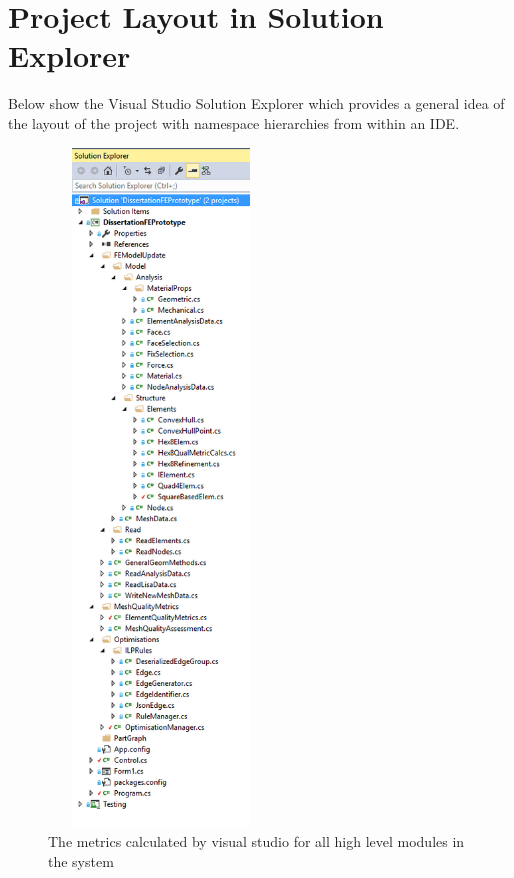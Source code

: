 \section{Project Layout in Solution Explorer}
Below show the Visual Studio Solution Explorer which provides a general idea of the layout of the project with namespace hierarchies from within an IDE.

\begin{figure}[H]
  \centerline{\includegraphics[width=60mm, height=180mm, scale=0.25]{../Graphics/VSolutionExplorer.png}}
  \caption{The metrics calculated by visual studio for all high level modules in the system}
\end{figure}




